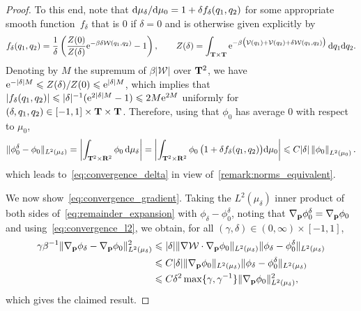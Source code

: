 \documentclass[11pt,a4paper]{article}
\begin{document}
\begin{proof}
    To this end, note that
    \(
        \mathrm d \mu_{\delta} / \mathrm d \mu_0  = 1 + \delta f_{\delta}(q_1, q_2)
    \)
    for some appropriate smooth function~$f_{\delta}$ that is $0$ if $\delta = 0$ and is otherwise given explicitly by
    \[
        f_{\delta}(q_1, q_2) = \frac{1}{\delta} \left( \frac{Z(0)}{Z(\delta)} \mathrm{e}^{- \beta \delta \mathcal W(q_1, q_2)} - 1 \right),
        \qquad Z(\delta) = \int_{\mathbf T \times \mathbf T} \mathrm{e}^{- \beta\bigl(\mathcal V(q_1) + \mathcal V(q_2) + \delta \mathcal W(q_1, q_2)\bigr)} \, \mathrm d q_1 \mathrm d q_2.
    \]
    Denoting by $M$ the supremum of $\beta |\mathcal W|$ over $\mathbf T^2$,
    we have $\mathrm{e}^{-\lvert \delta \rvert M} \leqslant Z(\delta)/Z(0) \leqslant \mathrm{e}^{\lvert \delta \rvert M}$,
    which implies that $\lvert f_{\delta}(q_1, q_2) \rvert \leqslant \lvert \delta \rvert^{-1}(\mathrm{e}^{2 \lvert \delta \rvert M} - 1) \leqslant 2M\mathrm{e}^{2M}$
    uniformly for $(\delta, q_1, q_2) \in [-1, 1] \times \mathbf T \times \mathbf T$.
    Therefore, using that $\phi_0$ has average 0 with respect to $\mu_0$,
    \[
        \norm*{\phi_0^\delta - \phi_0} [L^2(\mu_\delta)]
        = \abs{ \int_{\torus^2 \times \real^2} \phi_0 \, \d \mu_{\delta} }
        = \abs{ \int_{\torus^2 \times \real^2} \phi_0 \,\bigl( 1 + \delta f_{\delta}(q_1, q_2) \bigr)\d \mu_{0}}
        \leq C \lvert \delta \rvert \norm{\phi_0}[L^2(\mu_0)].
    \]
    which leads to~\eqref{eq:convergence_delta} in view of~\cref{remark:norms_equivalent}.

    We now show~\eqref{eq:convergence_gradient}.
    Taking the $L^2(\mu_{\delta})$ inner product of both sides of~\eqref{eq:remainder_expansion} with $\phi_\delta - \phi_0^{\delta}$,
    noting that $\nabla_{\boldsymbol{\mathbf p}} \phi_0^{\delta} = \nabla_{\boldsymbol{\mathbf p}} \phi_0$
    and using~\eqref{eq:convergence_l2},
    we obtain,
    for all $(\gamma, \delta) \in (0, \infty) \times [-1, 1]$,
    \begin{align*}
        \notag
        \gamma \beta^{-1} \norm*{\grad_{\vect p} \phi_\delta - \grad_{\vect p} \phi_0}[L^2(\mu_{\delta})]^2
        &\leq \lvert \delta \rvert \norm*{\grad \mathcal W \cdot \grad_{\vect p} \phi_0}[L^2(\mu_{\delta})] \norm*{\phi_\delta - \phi_0^{\delta}}[L^2(\mu_{\delta})] \\
        \label{eq:intermediate_delta}
        &\leq C \lvert \delta \rvert \norm*{\grad_{\vect p} \phi_0}[L^2(\mu_{\delta})] \norm*{\phi_\delta - \phi_0^{\delta}}[L^2(\mu_{\delta})] \\
        &\leq  C \delta^2 \max\{\gamma, \gamma^{-1}\} \norm*{\grad_{\vect p} \phi_0}[L^2(\mu_{\delta})]^2,
    \end{align*}
    which gives the claimed result.
\end{proof}
\end{document}
